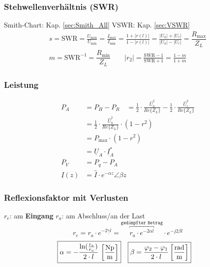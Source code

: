 \subsubsection{Stehwellenverhältnis (SWR)}
Smith-Chart: Kap. \ref{sec:Smith_All} \qquad VSWR: Kap. \ref{sec:VSWR}
\begin{align*}
	 & s = \mathrm{SWR}       = \frac{U_\text{max}}{U_\text{min}} = \frac{I_\text{max}}{I_\text{min}} = \frac{1+|r(l)|}{1-|r(l)|} = \frac{|U_h|+|U_r|}{|U_h|-|U_r|}= \dfrac{R_{\text{max}}}{Z_L} & \\
	 & m = \mathrm{SWR}^{-1} = \dfrac{R_{\text{min}}}{Z_L} \qquad |r_2| = \frac{\text{SWR}-1}{\text{SWR}+1} = \frac{1-m}{1+m}                                                                    &
\end{align*}

\subsubsection{Leistung}
\begin{align*}
	P_{A}            & = P_{H}-P_{R}
	\quad = \frac{1}{2} \cdot \frac{\hat{U}_{h}^{2}}{Re\{Z_{L}\}}-\frac{1}{2} \cdot \frac{\hat{U}_{r}^{2}}{Re\{Z_{L}\}} \\
	                 & =\frac{1}{2} \cdot \frac{\hat{U}_{h}^{2}}{Re\{Z_{L}\}} \cdot\left(1-r^{2}\right)                 \\
	                 & = P_{\max} \cdot\left(1-r^{2}\right)                                                             \\
	                 & = \underline{U}_A\cdot\underline{I}_A^*                                                          \\
	P_V              & = P_q -P_A                                                                                       \\
	\underline{I}(z) & = \hat{I}\cdot e^{-\alpha z}\angle \beta z
\end{align*}

\subsubsection{Reflexionsfaktor mit Verlusten}
$ r_e $: am \textbf{Eingang} \qquad $ r_a $: am Abschluss/an der Last
\[
	r_e = r_a \cdot e^{-2\underline{\gamma} l} =  \overbracket{r_a \cdot e^{-2\alpha l}}^ \texttt{gedämpfter Betrag} \cdot e^{-j2\beta l}
\]
\begin{align*}
	\Aboxed{\alpha & = -\frac{\ln(\frac{r_e}{r_a})}{2 \cdot l} \, \left[ \frac{\si{Np}}{\si{m}} \right]  } & \Aboxed{\beta & = \dfrac{\varphi_2 -\varphi_1}{2\cdot l} \left[ \frac{\si{rad}}{\si{m}} \right] }
\end{align*}

